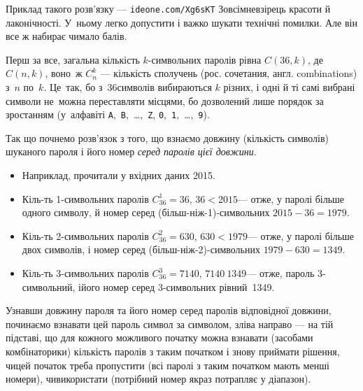 Приклад такого розв’язку --- \verb"ideone.com/Xg6sKT"\hspace{1em plus 1em}%
Зовсім\nolinebreak[2] не\nolinebreak[3] взірець красоти й лаконічності. У~ньому легко допустити і важко шукати технічні помилки. Але він все ж набирає чимало балів.

Перш за все, загальна кількість $k$-сим\-воль\-них паролів рівна $C(36, k)$, де $C(n,k)$, воно~ж $C_n^k$ --- кількість сполучень (рос. сочетания, англ. combinations) з~$n$ по~$k$. Це~так, бо з~36\nolinebreak[3] символів вибираються $k$ різних, і одні й ті самі вибрані символи не~можна переставляти місцями, бо дозволений лише порядок за зростанням (у~алфавіті \texttt{A},~\texttt{B},~\dots,~\texttt{Z}, \texttt{0},~\texttt{1},~\dots,~\texttt{9}).

Так що почнемо розв’язок з того, що взнаємо довжину (кількість символів) шуканого пароля і його номер \emph{серед паролів цієї довжини}.

\begin{small}
\begin{itemize}
\item[] Наприклад, прочитали у вхідних даних 2015.

\item Кіль-ть 1-символьних паролів ${C_{36}^1{=}36}$,\hspace{0.5em plus 1em} ${36{<}2015}$\nolinebreak[3] --- отже, у паролі більше одного символу, й номер серед (більш-ніж-1)-символьних ${2015-36=1979}$.

\item Кіль-ть 2-символьних паролів ${C_{36}^2{=}630}$,\hspace{0.5em plus 1em} ${630{<}1979}$\nolinebreak[3] --- отже, у паролі більше двох символів, і номер серед (більш-ніж-2)-символьних ${1979-630=1349}$.

\item Кіль-ть 3-символьних паролів ${C_{36}^3{=}7140}$,\hspace{0.5em plus 1em} ${7140{\>}1349}$\nolinebreak[3] --- отже, пароль 3-символьний, і\nolinebreak[3] його номер серед 3-символьних рівний~1349.

\end{itemize}
\end{small}

Узнавши довжину пароля та його номер серед паролів 
відповідної довжини, починаємо взнавати цей пароль символ за символом, зліва направо --- на тій підставі, що для кожного можливого початку можна взнавати (засобами комбінаторики) 
кількість паролів з таким початком і знову приймати рішення, чи\nolinebreak[3] цей початок треба пропустити (всі паролі з таким початком мають менші номери), чи\nolinebreak[3] використати (потрібний номер якраз потрапляє у діапазон).

